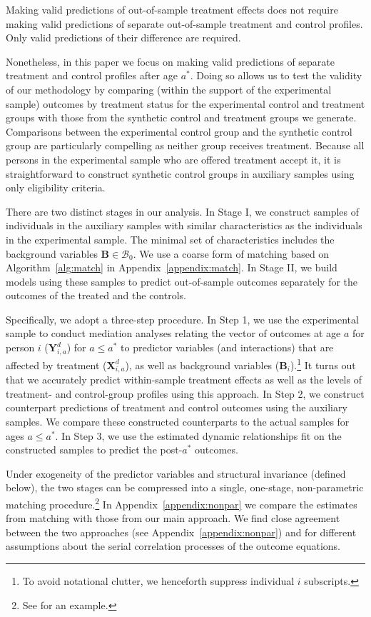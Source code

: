 Making valid predictions of out-of-sample treatment effects does not require making valid predictions of separate out-of-sample treatment and control profiles. Only valid predictions of their difference are required.

Nonetheless, in this paper we focus on making valid predictions of separate treatment and control profiles after age $a^*$. Doing so allows us to test the validity of our methodology by comparing (within the support of the experimental sample) outcomes by treatment status for the experimental control and treatment groups with those from the synthetic control and treatment groups we generate. Comparisons between the experimental control group and the synthetic control group are particularly compelling as neither group receives treatment. Because all persons in the experimental sample who are offered treatment accept it, it is straightforward to construct synthetic control groups in auxiliary samples using only eligibility criteria.

There are two distinct stages in our analysis. In Stage I, we construct samples of individuals in the auxiliary samples with similar characteristics as the individuals in the experimental sample. The minimal set of characteristics includes the background variables $\bm{B} \in \mathcal{B}_0$. We use a coarse form of matching based on Algorithm~\ref{alg:match} in  Appendix~\ref{appendix:match}. In Stage II, we build models using these samples to predict out-of-sample outcomes separately for the outcomes of the treated and the controls.

Specifically, we adopt a three-step procedure. In Step 1, we use the experimental sample to conduct mediation analyses relating the vector of outcomes at age $a$ for person $i$ ($\bm{Y}^{d}_{i,a}$) for $a\leq a^*$ to predictor variables (and interactions) that are affected by treatment ($\bm{X}^{d}_{i,a}$), as well as background variables ($\bm{B}_i$).\footnote{To avoid notational clutter, we henceforth suppress individual $i$ subscripts.} It turns out that we accurately predict within-sample treatment effects as well as the levels of treatment- and control-group profiles using this approach. In Step 2, we construct counterpart predictions of treatment and control outcomes using the auxiliary samples. We compare these constructed counterparts to the actual samples for ages $a \leq a^\ast$. In Step 3, we use the estimated dynamic relationships fit on the constructed samples to predict the post-$a^{\ast}$ outcomes.

Under exogeneity of the predictor variables and structural invariance (defined below), the two stages can be compressed into a single, one-stage, non-parametric matching procedure.\footnote{See \citet{Heckman_Ichimura_etal_1998_Econometrica} for an example.} In  Appendix~\ref{appendix:nonpar} we compare the estimates from matching with those from our main approach. We find close agreement between the two approaches (see  Appendix~\ref{appendix:nonpar}) and for different assumptions about the serial correlation processes of the outcome equations.

